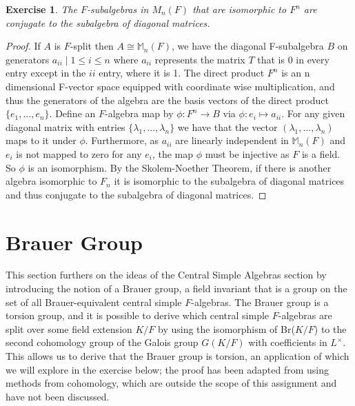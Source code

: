 \documentclass{article}
\newtheorem{exercise}{Exercise}[section]
\begin{document}
\begin{exercise}
The $F$-subalgebras in $M_{n}(F)$  that are isomorphic to $F^{n}$ are conjugate
to the subalgebra of diagonal matrices.
\end{exercise}
\begin{proof}

  If $A$ is $F$-split then $A \cong \mathbb{M}_{n}(F)$, we have the diagonal F-subalgebra $B$ on generators ${a_{ii} \mid 1 \leq i \leq n}$ where $a_{ii}$ represents the matrix $T$ that is 0 in every entry except in the $ii$ entry, where it is 1. The direct product $F^{n}$ is an n dimensional F-vector space equipped with coordinate wise multiplication, and thus the generators of the algebra are the basis vectors of the direct product $\{e_{1},...,e_{n}\}$. Define an $F$-algebra map by $\phi:F^{n} \to B$ via $\phi: e_{i} \mapsto a_{ii}$. For any given diagonal matrix with entries $\{\lambda_{1},...,\lambda_{n}\}$ we have that the vector $(\lambda_{1},...,\lambda_{n})$ maps to it under $\phi$. Furthermore, as $a_{ii}$ are linearly independent in $\mathbb{M}_{n}(F)$ and $e_{i}$ is not mapped to zero for any $e_{i}$, the map $\phi$ must be injective as $F$ is a field. So $\phi$ is an isomorphism. By the Skolem-Noether Theorem, if there is another algebra isomorphic to $F_{n}$ it is isomorphic to the subalgebra of diagonal matrices and thus conjugate to the subalgebra of diagonal matrices.
  
\end{proof}

\pagebreak


\section{Brauer Group}

This section furthers on the ideas of the Central Simple Algebras section by introducing the notion of a Brauer group, a field invariant that is a group on the set of all Brauer-equivalent central simple $F$-algebras. The Brauer group is a torsion group, and it is possible to derive which central simple $F$-algebras are split over some field extension $K/F$ by using the isomorphism of Br($K/F$) to the second cohomology group of the Galois group $G(K/F)$ with coefficients in $L^{\times}$. This allows us to derive that the Brauer group is torsion, an application of which we will explore in the exercise below; the proof has been adapted from \cite{CSABr} using methods from cohomology, which are outside the scope of this assignment and have not been discussed.   
\end{document}
